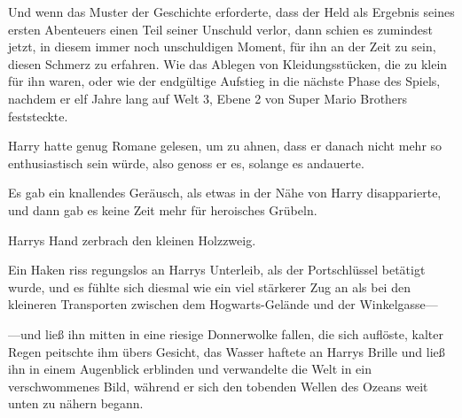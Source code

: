 Und wenn das Muster der Geschichte erforderte, dass der Held als Ergebnis seines ersten Abenteuers einen Teil seiner Unschuld verlor, dann schien es zumindest jetzt, in diesem immer noch unschuldigen Moment, für ihn an der Zeit zu sein, diesen Schmerz zu erfahren. Wie das Ablegen von Kleidungsstücken, die zu klein für ihn waren, oder wie der endgültige Aufstieg in die nächste Phase des Spiels, nachdem er elf Jahre lang auf Welt 3, Ebene 2 von Super Mario Brothers feststeckte.

Harry hatte genug Romane gelesen, um zu ahnen, dass er danach nicht mehr so enthusiastisch sein würde, also genoss er es, solange es andauerte.

Es gab ein knallendes Geräusch, als etwas in der Nähe von Harry disapparierte, und dann gab es keine Zeit mehr für heroisches Grübeln.

Harrys Hand zerbrach den kleinen Holzzweig.

Ein Haken riss regungslos an Harrys Unterleib, als der Portschlüssel betätigt wurde, und es fühlte sich diesmal wie ein viel stärkerer Zug an als bei den kleineren Transporten zwischen dem Hogwarts-Gelände und der Winkelgasse—

—und ließ ihn mitten in eine riesige Donnerwolke fallen, die sich auflöste, kalter Regen peitschte ihm übers Gesicht, das Wasser haftete an Harrys Brille und ließ ihn in einem Augenblick erblinden und verwandelte die Welt in ein verschwommenes Bild, während er sich den tobenden Wellen des Ozeans weit unten zu nähern begann.

